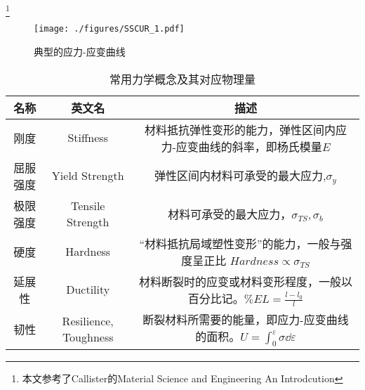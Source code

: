 
\begin{issues}
\issueDraft
\end{issues}
\footnote{本文参考了Callister的Material Science and Engineering An Introdcution}

\begin{figure}[ht]
\centering
\texttt{[image: ./figures/SSCUR\_1.pdf]}
\caption{典型的应力-应变曲线} \label{SSCUR_fig1}
\end{figure}



\begin{table}[ht]
\centering
\caption{常用力学概念及其对应物理量}\label{SSCUR_tab1}
\begin{tabular}{|c|c|c|}
\hline
名称 & 英文名 & 描述\\
\hline
刚度 & Stiffness & 材料抵抗弹性变形的能力，弹性区间内应力-应变曲线的斜率，即杨氏模量$E$\\
\hline
屈服强度 & Yield Strength & 弹性区间内材料可承受的最大应力,$\sigma_y$\\
\hline
极限强度 & Tensile Strength & 材料可承受的最大应力，$\sigma_{TS}, \sigma_b$\\
\hline
硬度 & Hardness & “材料抵抗局域塑性变形”的能力，一般与强度呈正比 $Hardness \propto \sigma_{TS}$\\
\hline
延展性 & Ductility & 材料断裂时的应变或材料变形程度，一般以百分比记。$\%EL = \frac{l-l_0}{l} $\\
\hline
韧性 & Resilience, Toughness & 断裂材料所需要的能量，即应力-应变曲线的面积。$U = \int_0^\varepsilon \sigma \dd \varepsilon$\\
\hline
\end{tabular}
\end{table}

